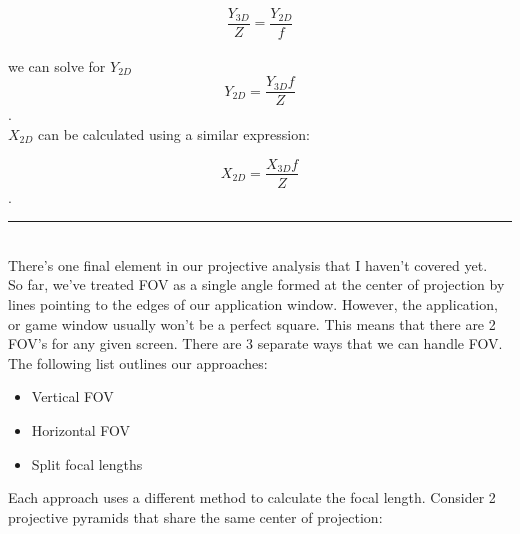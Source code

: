 \documentclass[11.pt]{article}
\begin{document}
$$ \frac{Y_{3D}}{Z} = \frac{Y_{2D}}{f} $$\\

we can solve for $Y_{2D}$\\

$$ Y_{2D} = \frac{Y_{3D}f}{Z}$$.\\

$X_{2D}$ can be calculated using a similar expression:

$$ X_{2D} = \frac{X_{3D}f}{Z}$$.\\

\rule{12cm}{0.4pt}
\\

There's one final element in our projective analysis that I haven't covered yet.\\

So far, we've treated FOV as a single angle formed at the center of projection 
by lines pointing to the edges of our application window. However, the application, 
or game window usually won't be a perfect square. This means that there are 2 FOV's for
any given screen. There are 3 separate ways that we can handle FOV. The following 
list outlines our approaches:

\begin{itemize}
\item Vertical FOV
\item Horizontal FOV
\item Split focal lengths
\end{itemize}

Each approach uses a different method to calculate the focal length. Consider 2
projective pyramids that share the same center of projection:\\
\end{document}
